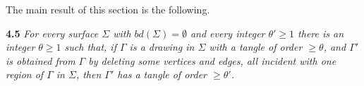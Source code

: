 The main result of this section is the following.

\textbf{4.5} \textit{For every surface $\Sigma$ with $bd(\Sigma) = \emptyset$ and every integer $\theta' \ge 1$ there is an integer $\theta \ge 1$ such that, if $\Gamma$ is a drawing in $\Sigma$ with a tangle of order $\ge \theta$, and $\Gamma'$ is obtained from $\Gamma$ by deleting some vertices and edges, all incident with one region of $\Gamma$ in $\Sigma$, then $\Gamma'$ has a tangle of order $\ge \theta'$.}
